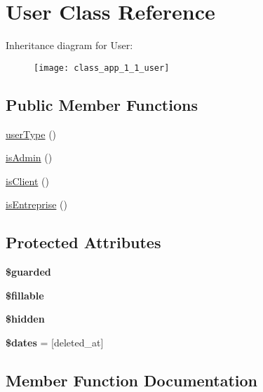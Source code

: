 \hypertarget{class_app_1_1_user}{}\section{User Class Reference}
\label{class_app_1_1_user}
Inheritance diagram for User\+:\begin{figure}[H]
\begin{center}
\leavevmode
\texttt{[image: class\_app\_1\_1\_user]}
\end{center}
\end{figure}
\subsection*{Public Member Functions}
\begin{DoxyCompactItemize}
\item 
\mbox{\hyperlink{class_app_1_1_user_a7d57b7b59a41f1e62a9162798054aee1}{user\+Type}} ()
\item 
\mbox{\hyperlink{class_app_1_1_user_aabf23b66cd362adaa508de5bfb22706a}{is\+Admin}} ()
\item 
\mbox{\hyperlink{class_app_1_1_user_ac72b53b5ba1db08b2dbc3146d05d5c07}{is\+Client}} ()
\item 
\mbox{\hyperlink{class_app_1_1_user_ad59f1d979560f3653c06b29d26a46cbd}{is\+Entreprise}} ()
\end{DoxyCompactItemize}
\subsection*{Protected Attributes}
\begin{DoxyCompactItemize}
\item 
{\bfseries \$guarded}
\item 
{\bfseries \$fillable}
\item 
{\bfseries \$hidden}
\item 
\mbox{\label{class_app_1_1_user_aab581066837d6296ba35c72937b6fc1c}} 
{\bfseries \$dates} = \mbox{[}\textquotesingle{}deleted\+\_\+at\textquotesingle{}\mbox{]}
\end{DoxyCompactItemize}


\subsection{Member Function Documentation}
\mbox{\label{class_app_1_1_user_aabf23b66cd362adaa508de5bfb22706a}} 
